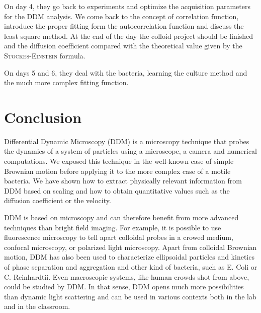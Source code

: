 \documentclass[prb,reprint,amsmath,amssymb]{revtex4-1}
\newcommand{\tg}[1]{{\color{magenta}#1}} %
\begin{document}
On day 4, they go back to experiments and optimize the acquisition parameters for the DDM analysis. We come back to the concept of correlation function, introduce the proper fitting form the autocorrelation function and discuss the least square method. At the end of the day the colloid project should be finished and the diffusion coefficient compared with the theoretical value given by the \textsc{Stockes-Einstein} formula.

On days 5 and 6, they deal with the bacteria, learning the culture method and the much more complex fitting function. 





\section{\label{cl}Conclusion}

Differential Dynamic Microscopy (DDM) is a microscopy technique that probes the dynamics of a system of particles using a microscope, a camera and numerical computations. We exposed this technique in the well-known case of simple Brownian motion before applying it to the more complex case of a motile bacteria. We have shown how to extract physically relevant information from DDM based on scaling and how to obtain quantitative values such as the diffusion coefficient or the velocity.

DDM is based  on microscopy and can therefore benefit from  more advanced techniques than bright field imaging. For example, it is possible to use fluorescence microscopy to tell apart colloidal probes in a crowed medium\cite{Hendricks2015}, confocal microscopy\cite{Lu2012}, or polarized light microscopy\citep{20_reufer2012differential}. Apart from colloidal Brownian motion, DDM has also been used to characterize ellipsoidal particles\citep{20_reufer2012differential} and kinetics of phase separation\cite{Gao2015} and aggregation\cite{Ferri2011} \tg{and other kind of bacteria, such as E. Coli or C. Reinhardtii\cite{4_Martinez20121637}}. Even macroscopic systems, like human crowds shot from above, could be studied by DDM. In that sense, DDM opens much more possibilities than dynamic light scattering and can be used in various contexts both in the lab and in the classroom.
\end{document}
